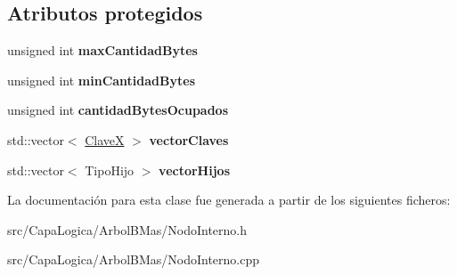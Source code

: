\subsection*{\-Atributos protegidos}
\begin{DoxyCompactItemize}
\item 
\hypertarget{class_nodo_interno_a42bdfaef87e9358f783227a2c1124e04}{unsigned int {\bfseries max\-Cantidad\-Bytes}}\label{class_nodo_interno_a42bdfaef87e9358f783227a2c1124e04}

\item 
\hypertarget{class_nodo_interno_a146d2e7f3c999bfda372417b193a9333}{unsigned int {\bfseries min\-Cantidad\-Bytes}}\label{class_nodo_interno_a146d2e7f3c999bfda372417b193a9333}

\item 
\hypertarget{class_nodo_interno_adb2c8a3113de80c12326214570d3e708}{unsigned int {\bfseries cantidad\-Bytes\-Ocupados}}\label{class_nodo_interno_adb2c8a3113de80c12326214570d3e708}

\item 
\hypertarget{class_nodo_interno_a2a1b65de783fe6d559d3de6c566a6059}{std\-::vector$<$ \hyperlink{class_clave_x}{\-Clave\-X} $>$ {\bfseries vector\-Claves}}\label{class_nodo_interno_a2a1b65de783fe6d559d3de6c566a6059}

\item 
\hypertarget{class_nodo_interno_ab322c57ba874ba7394844ea63fb6d599}{std\-::vector$<$ \-Tipo\-Hijo $>$ {\bfseries vector\-Hijos}}\label{class_nodo_interno_ab322c57ba874ba7394844ea63fb6d599}

\end{DoxyCompactItemize}


\-La documentación para esta clase fue generada a partir de los siguientes ficheros\-:\begin{DoxyCompactItemize}
\item 
src/\-Capa\-Logica/\-Arbol\-B\-Mas/\-Nodo\-Interno.\-h\item 
src/\-Capa\-Logica/\-Arbol\-B\-Mas/\-Nodo\-Interno.\-cpp\end{DoxyCompactItemize}
